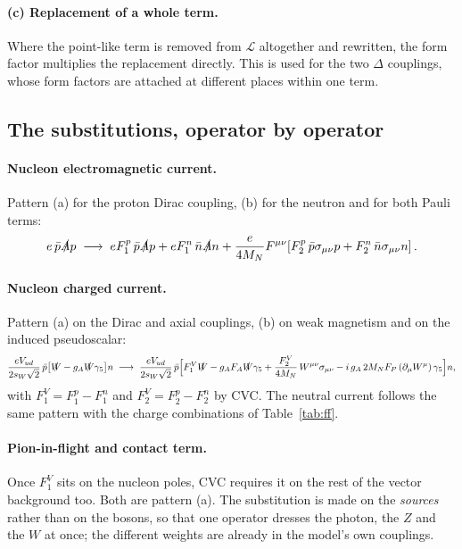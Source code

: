 \documentclass[11pt,a4paper]{article}
\begin{document}
\paragraph{(c) Replacement of a whole term.}
Where the point-like term is removed from $\mathcal{L}$ altogether and rewritten,
the form factor multiplies the replacement directly. This is used for the two
$\Delta$ couplings, whose form factors are attached at different places within
one term.

\subsection{The substitutions, operator by operator}

\paragraph{Nucleon electromagnetic current.} Pattern (a) for the proton Dirac
coupling, (b) for the neutron and for both Pauli terms:
\begin{equation}
  e\,\bar p \slashed A p
  \;\longrightarrow\;
  e F_1^p\, \bar p \slashed A p
  + e F_1^n\, \bar n \slashed A n
  + \frac{e}{4M_N} F^{\mu\nu}\!\left[
      F_2^p\, \bar p \sigma_{\mu\nu} p + F_2^n\, \bar n \sigma_{\mu\nu} n\right].
\end{equation}

\paragraph{Nucleon charged current.} Pattern (a) on the Dirac and axial
couplings, (b) on weak magnetism and on the induced pseudoscalar:
\begin{equation}
  \frac{e V_{ud}}{2 s_W\sqrt2}\,\bar p\big[\slashed W - g_A \slashed W \gamma_5\big] n
  \;\longrightarrow\;
  \frac{e V_{ud}}{2 s_W\sqrt2}\,\bar p\Big[
      F_1^V \slashed W
    - g_A F_A \slashed W \gamma_5
    + \frac{F_2^V}{4M_N}\,W^{\mu\nu}\sigma_{\mu\nu}
    - i\, g_A\, 2M_N F_P\, (\partial_\mu W^\mu)\,\gamma_5
  \Big] n ,
\end{equation}
with $F_1^V = F_1^p - F_1^n$ and $F_2^V = F_2^p - F_2^n$ by CVC. The neutral
current follows the same pattern with the charge combinations of
Table~\ref{tab:ff}.

\paragraph{Pion-in-flight and contact term.} Once $F_1^V$ sits on the nucleon
poles, CVC requires it on the rest of the vector background too. Both are
pattern (a). The substitution is made on the \emph{sources} rather than on the
bosons, so that one operator dresses the photon, the $Z$ and the $W$ at once;
the different weights are already in the model's own couplings.
\end{document}
